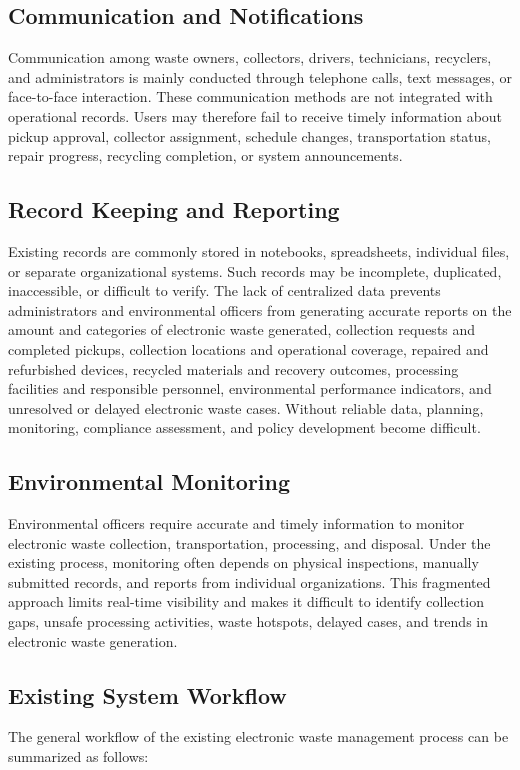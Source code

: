 \subsection{Communication and Notifications}
Communication among waste owners, collectors, drivers, technicians, recyclers,
and administrators is mainly conducted through telephone calls, text messages,
or face-to-face interaction. These communication methods are not integrated with
operational records. Users may therefore fail to receive timely information about
pickup approval, collector assignment, schedule changes, transportation status,
repair progress, recycling completion, or system announcements.

\subsection{Record Keeping and Reporting}
Existing records are commonly stored in notebooks, spreadsheets, individual files,
or separate organizational systems. Such records may be incomplete, duplicated,
inaccessible, or difficult to verify. The lack of centralized data prevents
administrators and environmental officers from generating accurate reports on
the amount and categories of electronic waste generated, collection requests and
completed pickups, collection locations and operational coverage, repaired and
refurbished devices, recycled materials and recovery outcomes, processing
facilities and responsible personnel, environmental performance indicators, and
unresolved or delayed electronic waste cases. Without reliable data, planning,
monitoring, compliance assessment, and policy development become difficult.

\subsection{Environmental Monitoring}
Environmental officers require accurate and timely information to monitor
electronic waste collection, transportation, processing, and disposal. Under the
existing process, monitoring often depends on physical inspections, manually
submitted records, and reports from individual organizations. This fragmented
approach limits real-time visibility and makes it difficult to identify collection
gaps, unsafe processing activities, waste hotspots, delayed cases, and trends in
electronic waste generation.

\subsection{Existing System Workflow}
The general workflow of the existing electronic waste management process can
be summarized as follows:


